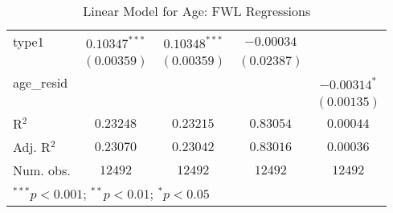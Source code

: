 \begin{table}
\begin{center}
\begin{tabular}{l c c c c}
type1            & $0.10347^{***}$  & $0.10348^{***}$  & $-0.00034$       &                \\
                 & $(0.00359)$      & $(0.00359)$      & $(0.02387)$      &                \\
age\_resid       &                  &                  &                  & $-0.00314^{*}$ \\
                 &                  &                  &                  & $(0.00135)$    \\
\hline
R$^2$            & $0.23248$        & $0.23215$        & $0.83054$        & $0.00044$      \\
Adj. R$^2$       & $0.23070$        & $0.23042$        & $0.83016$        & $0.00036$      \\
Num. obs.        & $12492$          & $12492$          & $12492$          & $12492$        \\
\hline
\multicolumn{5}{l}{\scriptsize{$^{***}p<0.001$; $^{**}p<0.01$; $^{*}p<0.05$}}
\end{tabular}
\caption{Linear Model for Age: FWL Regressions}
\label{tab:reg_age_fwl}
\end{center}
\end{table}
